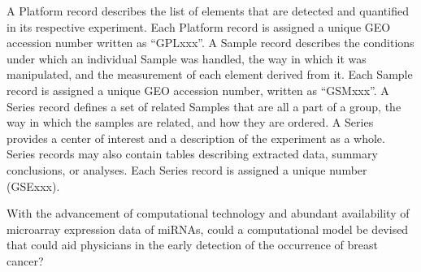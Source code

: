 \documentclass{bioinfo}
\begin{document}
A Platform record describes the list of elements that are detected and quantified in its respective experiment. Each Platform record is assigned a unique GEO accession number written as “GPLxxx”. A Sample record describes the conditions under which an individual Sample was handled, the way in which it was manipulated, and the measurement of each element derived from it. Each Sample record is assigned a unique GEO accession number, written as “GSMxxx”.  A Series record defines a set of related Samples that are all a part of a group, the way in which the samples are related, and how they are ordered. A Series provides a center of interest and a description of the experiment as a whole. Series records may also contain tables describing extracted data, summary conclusions, or analyses. Each Series record is assigned a unique number (GSExxx).

With the advancement of computational technology and abundant availability of microarray expression data of miRNAs, could a computational model be devised that could aid physicians in the early detection of the occurrence of breast cancer?
\end{document}
